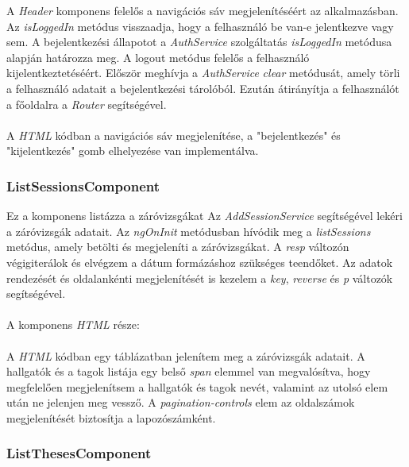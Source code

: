 A \textit{Header} komponens felelős a navigációs sáv megjelenítéséért az alkalmazásban. Az \textit{isLoggedIn} metódus visszaadja, hogy a felhasználó be van-e jelentkezve vagy sem. A bejelentkezési állapotot a \textit{AuthService} szolgáltatás \textit{isLoggedIn} metódusa alapján határozza meg. A logout metódus felelős a felhasználó kijelentkeztetéséért. Először meghívja a \textit{AuthService} \textit{clear} metódusát, amely törli a felhasználó adatait a bejelentkezési tárolóból. Ezután átirányítja a felhasználót a főoldalra a \textit{Router} segítségével.\\
\\
A \textit{HTML} kódban a navigációs sáv megjelenítése, a "bejelentkezés" és "kijelentkezés" gomb elhelyezése van implementálva.


\subsubsection{ListSessionsComponent}

Ez a komponens listázza a záróvizsgákat Az \textit{AddSessionService} segítségével lekéri a záróvizsgák adatait. Az \textit{ngOnInit} metódusban hívódik meg a \textit{listSessions} metódus, amely betölti és megjeleníti a záróvizsgákat. A \textit{resp} változón végigiterálok és elvégzem a dátum formázáshoz szükséges teendőket. Az adatok rendezését és oldalankénti megjelenítését is kezelem a \textit{key}, \textit{reverse} és \textit{p} változók segítségével.\\
\\
A komponens \textit{HTML} része:\\
\\
A \textit{HTML} kódban egy táblázatban jelenítem meg a záróvizsgák adatait.  A hallgatók és a tagok listája egy belső \textit{span} elemmel van megvalósítva, hogy megfelelően megjelenítsem a hallgatók és tagok nevét, valamint az utolsó elem után ne jelenjen meg vessző. A \textit{pagination-controls} elem az oldalszámok megjelenítését biztosítja a lapozószámként.

\subsubsection{ListThesesComponent}


